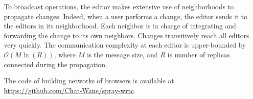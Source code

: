 To broadcast operations, the editor makes extensive use of neighborhoods to
propagate changes. Indeed, when a user performs a change, the editor sends it to
the editors in its neighborhood. Each neighbor is in charge of integrating and
forwarding the change to its own neighbors. Changes transitively reach all
editors very quickly. The communication complexity at each editor is
upper-bounded by $\mathcal{O}(M \ln(R))$, where $M$ is the message size, and $R$
is number of replicas connected during the propagation.

The code of \SPRAY building networks of browsers is available at
\url{https://github.com/Chat-Wane/spray-wrtc}.




